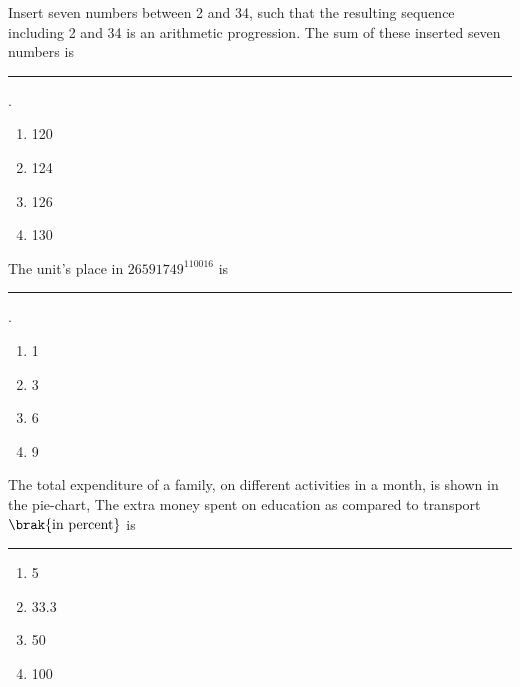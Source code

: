\item Insert seven numbers between 2 and 34, such that the resulting sequence including 2 and 34 is an arithmetic progression. The sum of these inserted seven numbers is \rule{1cm}{0.4pt}.
	\begin{enumerate}
                \item 120
                \item 124
                \item 126
                \item 130
	\end{enumerate}
\item The unit's place in $26591749^{110016}$ is \rule{1cm}{0.4pt}.
	\begin{enumerate}
		\item 1
                \item 3
                \item 6
                \item 9
	\end{enumerate}
\item The total expenditure of a family, on different activities in a month, is shown in the pie-chart, The extra money spent on education as compared to transport $\brak{\text{in percent}}$ is \rule{1cm}{0.4pt}
	\begin{enumerate}
                \item 5
                \item 33.3
                \item 50
                \item 100
        \end{enumerate}

